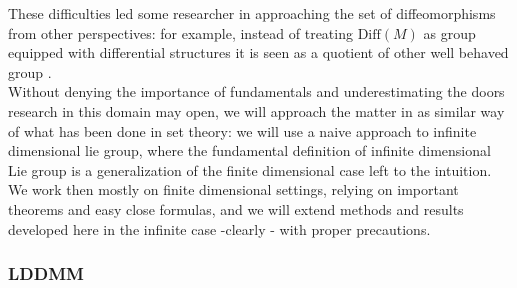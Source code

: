 These difficulties led some researcher in approaching the set of diffeomorphisms from other perspectives: for example, instead of treating $\text{Diff}(M)$ as group equipped with differential structures it is seen as a quotient of other well behaved group \cite{wojtynski1994one}.\\
Without denying the importance of fundamentals and underestimating the doors research in this domain may open, we will approach the matter in as similar way of what has been done in set theory: we will use a naive approach to infinite dimensional lie group, where the fundamental definition of infinite dimensional Lie group is a generalization of the finite dimensional case left to the intuition. 
We work then mostly on finite dimensional settings, relying on important theorems and easy close formulas, and we will extend methods and results developed here in the infinite case -clearly - with proper precautions.



\subsubsection{LDDMM}

